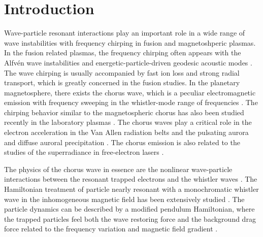 \section{Introduction}
\label{sec:intro}
Wave-particle resonant interactions play an important role  in a wide range of wave instabilities
with frequency chirping in fusion and magnetoshperic plasmas.
In the fusion related plasmas, the frequency chirping often appears with the Alfv\'en wave instabilities \cite{chen2016,wang2018,wang2012,wang2012a} and energetic-particle-driven geodesic acoustic modes \cite{wang2013}.
The wave chirping is usually accompanied by fast ion loss and strong radial transport, which is greatly concerned in the fusion studies.
In the planetary magnetosphere, there exists the chorus wave, which is a peculiar electromagnetic emission with frequency sweeping in the whistler-mode range of frequencies \cite{helliwell1965whistlers,burtis_magnetospheric_1976,tsurutani_postmidnight_1974}. 
The chirping behavior similar to the magnetospheric chorus has also been studied recently in the laboratory plasmas \cite{vancompernolle2015,saitoh2024}.
The chorus waves  play a critical role in the electron acceleration   in the Van Allen radiation belts \cite{horne_wave_2005,thorne_rapid_2013,reeves_electron_2013} and the pulsating aurora  and diffuse auroral precipitation \cite{nishimura_identifying_2010,kasahara_pulsating_2018,thorne_scattering_2010}.
The chorus emission is also related to 
 the studies of the superradiance in free-electron lasers \cite{zonca_nonlinear_2021, soto-chavez2012}.

The physics of the chorus wave in essence are the nonlinear wave-particle interactions \cite{oneil1971,oneil1972} between the resonant trapped electrons and the whistler waves \cite{omura_theory_2008, an2019}.
The Hamiltonian treatment of particle nearly resonant with a monochromatic whistler wave in the inhomogeneous magnetic field has been extensively studied \cite{albert1993,albert2021}.
The particle dynamics can be described by a modified pendulum Hamiltonian, where the trapped particles feel both the wave restoring force and the background drag force related to the frequency variation and magnetic field gradient \cite{zheng2024,tao_trap-release-amplify_2021}.

